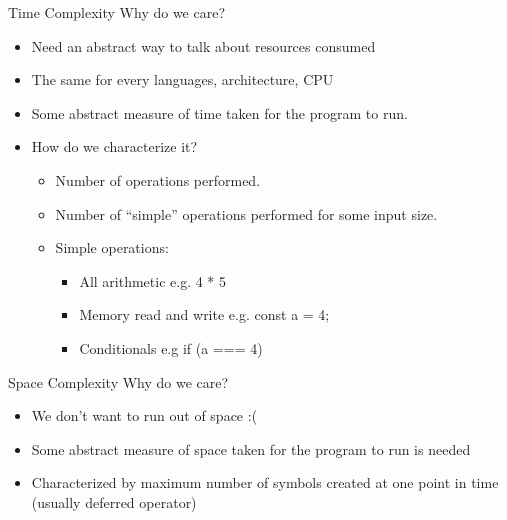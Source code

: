 \documentclass[10pt]{beamer}
\begin{document}
\begin{frame}[fragile]{Time Complexity}
Why do we care?
  \begin{itemize}
    \item Need an abstract way to talk about resources consumed
    \item The same for every languages, architecture, CPU
    \item Some abstract measure of time taken for the program to run.
    \item How do we characterize it?
    \begin{itemize}
      \item Number of operations performed.
      \item Number of “simple” operations performed for some input size.
      \item Simple operations:
      \begin{itemize}
        \item All arithmetic e.g. 4 * 5
        \item Memory read and write e.g. const a = 4;
        \item Conditionals e.g if (a === 4)
      \end{itemize}
    \end{itemize}
  \end{itemize}  
\end{frame}

\begin{frame}[fragile]{Space Complexity}
Why do we care?
  \begin{itemize}
    \item We don't want to run out of space :(
    \item Some abstract measure of space taken for the program to run is needed
    \item Characterized by maximum number of symbols created at one point in time (usually deferred operator)
  \end{itemize}
\end{frame}
\end{document}
